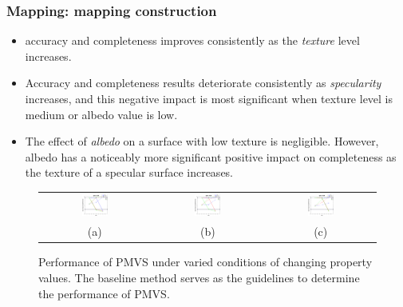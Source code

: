 \documentclass{beamer}
\begin{document}
\begin{frame}
\frametitle{Mapping: mapping construction}

\begin{itemize}
\item accuracy and completeness improves consistently as the \textit{texture} level increases. 
\item Accuracy and completeness results deteriorate consistently as \textit{specularity} increases, and this negative impact is most significant when texture level is medium or albedo value is low. 
\item The effect of \textit{albedo} on a surface with low texture is negligible. However, albedo has a noticeably more significant positive impact on completeness as the texture of a specular surface increases.
\end{itemize}

\begin{figure}[!htbp]
\begin{tabular}{ccc}
\includegraphics[width=0.25\textwidth]{mapping/training/mvs_train_spec_02}&
\includegraphics[width=0.25\textwidth]{mapping/training/mvs_train_spec_05}&
\includegraphics[width=0.25\textwidth]{mapping/training/mvs_train_spec_08}\\
(a) & (b) & (c)\\
\end{tabular}
\caption{Performance of PMVS under varied conditions of changing property values. The baseline method serves as the guidelines to determine the performance of PMVS.}
\label{fig:mvs_training}
\end{figure}

\end{frame}
\end{document}
